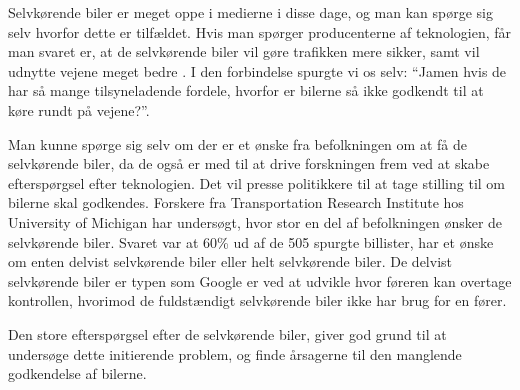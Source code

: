 Selvkørende biler er meget oppe i medierne i disse dage, og man kan spørge sig selv hvorfor dette er tilfældet. Hvis man spørger producenterne af teknologien, får man svaret er, at de selvkørende biler vil gøre trafikken mere sikker, samt vil udnytte vejene meget bedre \cite{GOOG_SITE}. I den forbindelse spurgte vi os selv: ``Jamen hvis de har så mange tilsyneladende fordele, hvorfor er bilerne så ikke godkendt til at køre rundt på vejene?''. 

Man kunne spørge sig selv om der er et ønske fra befolkningen om at få de selvkørende biler, da de også er med til at drive forskningen frem ved at skabe efterspørgsel efter teknologien. Det vil presse politikkere til at tage stilling til om bilerne skal godkendes. Forskere fra Transportation Research Institute hos University of Michigan har undersøgt, hvor stor en del af befolkningen ønsker de selvkørende biler\cite{UMTRI}. Svaret var at 60\% ud af de 505 spurgte billister, har et ønske om enten delvist selvkørende biler eller helt selvkørende biler. De delvist selvkørende biler er typen som Google er ved at udvikle hvor føreren kan overtage kontrollen, hvorimod de fuldstændigt selvkørende biler ikke har brug for en fører.

Den store efterspørgsel efter de selvkørende biler, giver god grund til at undersøge dette initierende problem, og finde årsagerne til den manglende godkendelse af bilerne.